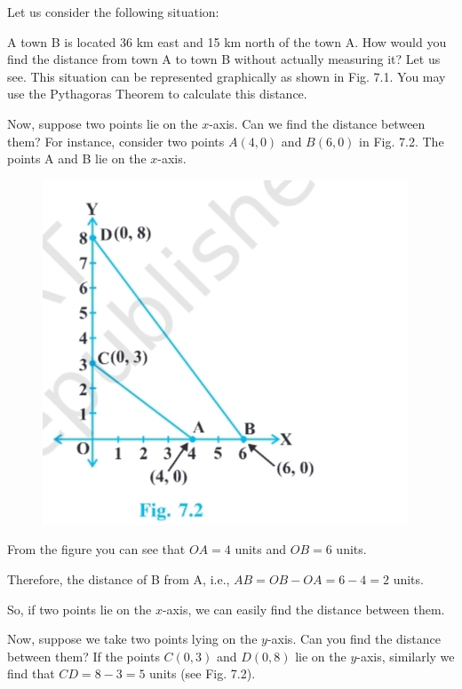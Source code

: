 \documentclass[11pt]{article}
\begin{document}
Let us consider the following situation:

A town B is located 36 km east and 15 km north of the town A. How would you find the distance from town A to town B without actually measuring it? Let us see. This situation can be represented graphically as shown in Fig. 7.1. You may use the Pythagoras Theorem to calculate this distance.

Now, suppose two points lie on the \(x\)-axis. Can we find the distance between them? For instance, consider two points \(A(4, 0)\) and \(B(6, 0)\) in Fig. 7.2. The points A and B lie on the \(x\)-axis.

\begin{figure}
  \vspace{-20pt}
  \centering
  \includegraphics[width=0.95\linewidth]{su.png}
  \vspace{-10pt}
\end{figure}

From the figure you can see that \(OA = 4\) units and \(OB = 6\) units.

Therefore, the distance of B from A, i.e., \(AB = OB - OA = 6 - 4 = 2\) units.

So, if two points lie on the \(x\)-axis, we can easily find the distance between them.

Now, suppose we take two points lying on the \(y\)-axis. Can you find the distance between them? If the points \(C(0, 3)\) and \(D(0, 8)\) lie on the \(y\)-axis, similarly we find that \(CD = 8 - 3 = 5\) units (see Fig. 7.2).
\end{document}
